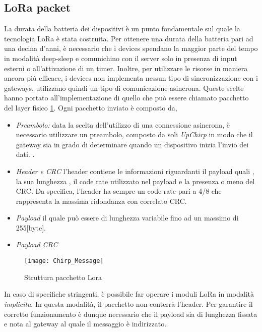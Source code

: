 \subsection{LoRa packet}
La durata della batteria dei dispositivi è un punto fondamentale sul quale la
tecnologia LoRa è stata costruita.  Per ottenere una durata della batteria pari
ad una decina d'anni, è necessario che i devices spendano la maggior parte del
tempo in modalità deep-sleep e comunichino con il server solo in presenza di
input esterni o all'attivazione di un timer.  Inoltre, per utilizzare
le risorse in maniera ancora più efficace, i devices non implementa nessun tipo
di sincronizzazione con i gateways, utilizzano quindi un tipo di comunicazione
asincrona.
Queste scelte hanno portato all'implementazione di quello che può essere
chiamato pacchetto del layer fisico \ref{fig:phis_pack}.  Ogni pacchetto
inviato è composto da,
\begin{itemize}
        \item   \emph{Preambolo:} data la scelta dell'utilizzo di una
                connessione asincrona, è necessario utilizzare un preambolo,
                composto da soli \emph{UpChirp} in modo che il gateway sia in
                grado di determinare quando un dispositivo inizia l'invio dei
                dati. .
        \item   \emph{Header e CRC} l'header contiene le informazioni riguardanti
                il payload quali , la sua lunghezza , il code rate utilizzato nel
                payload e la presenza o meno del CRC. Da specifica, l'header ha sempre
                un code-rate pari a 4/8 che rappresenta la massima ridondanza con
                correlato CRC. 
        \item   \emph{Payload} il quale può essere di lunghezza variabile fino ad
                un massimo di 255[byte].
        \item   \emph{Payload CRC}
\end{itemize}
\begin{figure}[h]
        \centering 
                \texttt{[image: Chirp\_Message]}
        \caption{Struttura pacchetto Lora }
        \label{fig:phis_pack}
\end{figure}
In caso di specifiche stringenti, è possibile far operare i moduli LoRa in
modalità \emph{implicita}. In questa modalità, il pacchetto non conterrà
l'header. Per garantire il corretto funzionamento è dunque necessario che il
payload sia di lunghezza fissata e nota al gateway al quale il messaggio è
indirizzato.
